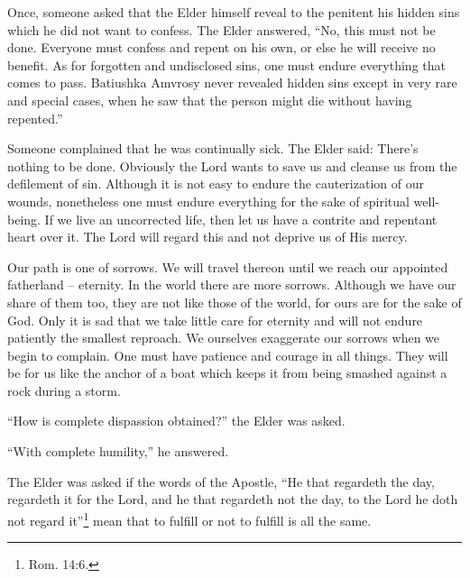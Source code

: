 Once, someone asked that the Elder himself reveal to the penitent his hidden sins which he did not want to confess. The Elder answered, ``No, this must not be done. Everyone must confess and repent on his own, or else he will receive no benefit. As for forgotten and undisclosed sins, one must endure everything that comes to pass. Batiushka Amvrosy never revealed hidden sins except in very rare and special cases, when he saw that the person might die without having repented.''

\begin{longquote}{Someone complained that he was continually sick. The Elder said:}
There's nothing to be done. Obviously the Lord wants to save us and cleanse us from the defilement of sin. Although it is not easy to endure the cauterization of our wounds, nonetheless one must endure everything for the sake of spiritual well-being. If we live an uncorrected life, then let us have a contrite and repentant heart over it. The Lord will regard this and not deprive us of His mercy.

Our path is one of sorrows. We will travel thereon until we reach our appointed fatherland -- eternity. In the world there are more sorrows. Although we have our share of them too, they are not like those of the world, for ours are for the sake of God. Only it is sad that we take little care for eternity and will not endure patiently the smallest reproach. We ourselves exaggerate our sorrows when we begin to complain. One must have patience and courage in all things. They will be for us like the anchor of a boat which keeps it from being smashed against a rock during a storm.
\end{longquote}

``How is complete dispassion obtained?'' the Elder was asked.

``With complete humility,'' he answered.

The Elder was asked if the words of the Apostle, ``He that regardeth the day, regardeth it for the Lord, and he that regardeth not the day, to the Lord he doth not regard it''\footnote{Rom. 14:6.} mean that to fulfill or not to fulfill is all the same.

